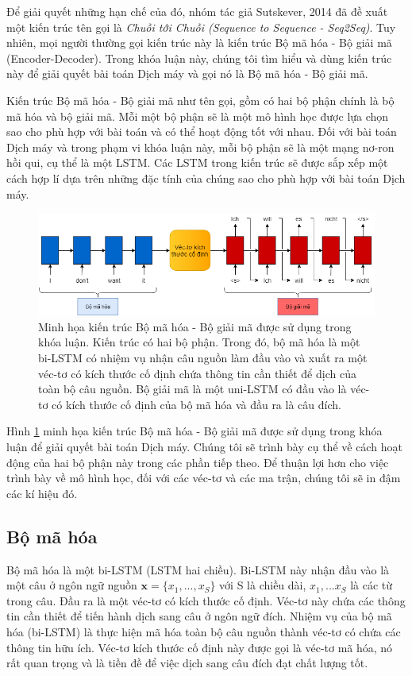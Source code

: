 Để giải quyết những hạn chế của đó, nhóm tác giả Sutskever, 2014 \cite{Seq2Seq2014} đã đề xuất một kiến trúc tên gọi là \textit{Chuỗi tới Chuỗi (Sequence to Sequence - Seq2Seq)}. Tuy nhiên, mọi người thường gọi kiến trúc này là kiến trúc Bộ mã hóa - Bộ giải mã (Encoder-Decoder). Trong khóa luận này, chúng tôi tìm hiểu và dùng kiến trúc này để giải quyết bài toán Dịch máy và gọi nó là Bộ mã hóa - Bộ giải mã.

Kiến trúc Bộ mã hóa - Bộ giải mã như tên gọi, gồm có hai bộ phận chính là bộ mã hóa và bộ giải mã. Mỗi một bộ phận sẽ là một mô hình học được lựa chọn sao cho phù hợp với bài toán và có thể hoạt động tốt với nhau. Đối với bài toán Dịch máy và trong phạm vi khóa luận này, mỗi bộ phận sẽ là một mạng nơ-ron hồi qui, cụ thể là một LSTM. Các LSTM trong kiến trúc sẽ được sắp xếp một cách hợp lí dựa trên những đặc tính của chúng sao cho phù hợp với bài toán Dịch máy.

\begin{figure}
	\centering
	\includegraphics[width=1.0\textwidth]{Encoder-Decoder_2}
	\caption[Minh họa kiến trúc Bộ mã hóa - Bộ giải mã được sử dụng trong khóa luận.]{Minh họa kiến trúc Bộ mã hóa - Bộ giải mã được sử dụng trong khóa luận. Kiến trúc có hai bộ phận. Trong đó, bộ mã hóa là một bi-LSTM có nhiệm vụ nhận câu nguồn làm đầu vào và xuất ra một véc-tơ có kích thước cố định chứa thông tin cần thiết để dịch của toàn bộ câu nguồn. Bộ giải mã là một uni-LSTM có đầu vào là véc-tơ có kích thước cố định của bộ mã hóa và đầu ra là câu đích.}
	\label{fig_Encoder-Decoder}
\end{figure}

Hình \ref{fig_Encoder-Decoder} minh họa kiến trúc Bộ mã hóa - Bộ giải mã được sử dụng trong khóa luận để giải quyết bài toán Dịch máy. Chúng tôi sẽ trình bày cụ thể về cách hoạt động của hai bộ phận này trong các phần tiếp theo. Để thuận lợi hơn cho việc trình bày về mô hình học, đối với các véc-tơ và các ma trận, chúng tôi sẽ in đậm các kí hiệu đó.

\subsection{Bộ mã hóa}
Bộ mã hóa là một bi-LSTM (LSTM hai chiều). Bi-LSTM này nhận đầu vào là một câu ở ngôn ngữ nguồn $\bm{x} = \{x_1, ..., x_S\}$ với S là chiều dài, $x_1,...x_S$ là các từ trong câu. Đầu ra là một véc-tơ có kích thước cố định. Véc-tơ này chứa các thông tin cần thiết để tiến hành dịch sang câu ở ngôn ngữ đích. Nhiệm vụ của bộ mã hóa (bi-LSTM) là thực hiện mã hóa toàn bộ câu nguồn thành véc-tơ có chứa các thông tin hữu ích. Véc-tơ kích thước cố định này được gọi là véc-tơ mã hóa, nó rất quan trọng và là tiền đề để việc dịch sang câu đích đạt chất lượng tốt.

